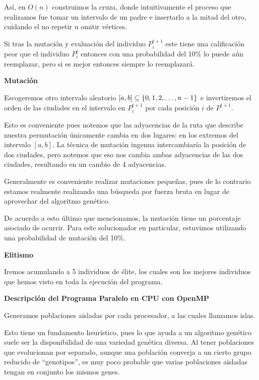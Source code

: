 \documentclass[main.tex]{subfiles}
\begin{document}
Así, en $O(n)$ construimos la cruza, donde intuitivamente el proceso que
realizamos fue tomar un intervalo de un padre e insertarlo a la mitad del otro,
cuidando el no repetir u omitir vértices.

Si tras la mutación y evaluación del individuo $P_i^{t+1}$ este tiene una
calificación peor que el individuo $P_i^{t}$ entonces con una probabilidad del
10\% lo puede aún reemplazar, pero si es mejor entonces siempre lo reemplazará.

\textbf{Mutación}

Escogeremos otro intervalo aleatorio $[a,b] \subseteq \left\{ 0,1,2,\dots,n-1 \right\}$ e
invertiremos el orden de las ciudades en el intervalo en $P_i^{t+1}$ por cada
posición $i$ de $P^{t+1}$.

Esto es conveniente pues notemos que las adyacencias de la ruta que describe
nuestra permutación únicamente cambia en dos lugares: en los extremos del
intervalo $[a,b]$. La técnica de mutación ingenua intercambiaría la posición
de dos ciudades, pero notemos que eso nos cambia ambas adyacencias de las dos
ciudades, resultando en un cambio de 4 adyacencias.

Generalmente es conveniente realizar mutaciones pequeñas, pues de lo contrario
estamos realmente realizando una búsqueda por fuerza bruta en lugar de
aprovechar del algoritmo genético.

De acuerdo a esto último que mencionamos, la mutación tiene un porcentaje
asociado de ocurrir. Para este solucionador en particular, estuvimos utilizando
una probabilidad de mutación del 10\%.

\textbf{Elitismo}

Iremos acumulando a 5 individuos de élite, los cuales son los mejores
individuos que hemos visto en toda la ejecución del programa.

\begin{cajaEnunciado}
    \textbf{Descripción del Programa Paralelo en CPU con OpenMP}
\end{cajaEnunciado}

Generamos poblaciones aisladas por cada procesador, a las cuales llamamos islas.

Esto tiene un fundamento heurístico, pues lo que ayuda a un algoritmo genético
suele ser la disponibilidad de una variedad genética diversa. Al tener
poblaciones que evolucionan por separado, aunque una población converja a un
cierto grupo reducido de ``genotipos'', es muy poco probable que varias
poblaciones aisladas tengan en conjunto los mismos genes.
\end{document}
